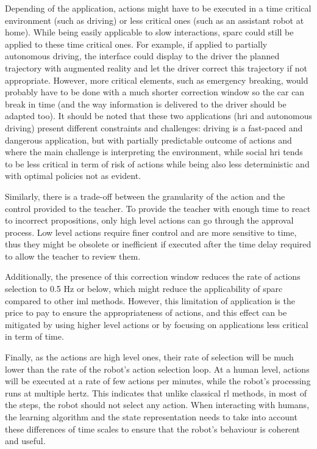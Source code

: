 Depending of the application, actions might have to be executed in a time critical environment (such as driving) or less critical ones (such as an assistant robot at home). While being easily applicable to slow interactions, \gls{sparc} could still be applied to these time critical ones. For example, if applied to partially autonomous driving, the interface could display to the driver the planned trajectory with augmented reality and let the driver correct this trajectory if not appropriate. However, more critical elements, such as emergency breaking, would probably have to be done with a much shorter correction window so the car can break in time (and the way information is delivered to the driver should be adapted too). It should be noted that these two applications (\gls{hri} and autonomous driving) present different constraints and challenges: driving is a fast-paced and dangerous application, but with partially predictable outcome of actions and where the main challenge is interpreting the environment, while social \gls{hri} tends to be less critical in term of risk of actions while being also less deterministic and with optimal policies not as evident.

Similarly, there is a trade-off between the granularity of the action and the control provided to the teacher. To provide the teacher with enough time to react to incorrect propositions, only high level actions can go through the approval process. Low level actions require finer control and are more sensitive to time, thus they might be obsolete or inefficient if executed after the time delay required to allow the teacher to review them.

Additionally, the presence of this correction window reduces the rate of actions selection to 0.5 Hz or below, which might reduce the applicability of \gls{sparc} compared to other \gls{iml} methods. However, this limitation of application is the price to pay to ensure the appropriateness of actions, and this effect can be mitigated by using higher level actions or by focusing on applications less critical in term of time. 

Finally, as the actions are high level ones, their rate of selection will be much lower than the rate of the robot's action selection loop. At a human level, actions will be executed at a rate of few actions per minutes, while the robot's processing runs at multiple hertz. This indicates that unlike classical \gls{rl} methods, in most of the steps, the robot should not select any action. When interacting with humans, the learning algorithm and the state representation needs to take into account these differences of time scales to ensure that the robot's behaviour is coherent and useful.

